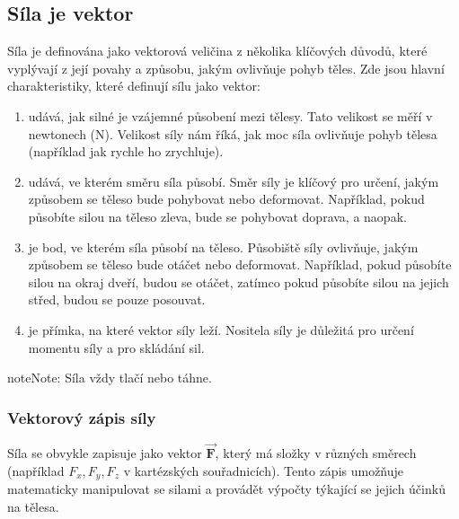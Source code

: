 \documentclass[letterpaper,10pt,english]{jupyterBook}
\begin{document}
\subsection{Síla je vektor}
\label{\detokenize{Prednasky/1_3_Dynamika_pohybu_v_1D:sila-je-vektor}}
\sphinxAtStartPar
Síla je definována jako vektorová veličina z několika klíčových důvodů, které vyplývají z její povahy a způsobu, jakým ovlivňuje pohyb těles. Zde jsou hlavní charakteristiky, které definují sílu jako vektor:
\begin{enumerate}
%
\item {} 
\sphinxAtStartPar
{} udává, jak silné je vzájemné působení mezi tělesy. Tato velikost se měří v newtonech (N). Velikost síly nám říká, jak moc síla ovlivňuje pohyb tělesa (například jak rychle ho zrychluje).

\item {} 
\sphinxAtStartPar
{} udává, ve kterém směru síla působí. Směr síly je klíčový pro určení, jakým způsobem se těleso bude pohybovat nebo deformovat. Například, pokud působíte silou na těleso zleva, bude se pohybovat doprava, a naopak.

\item {} 
\sphinxAtStartPar
{} je bod, ve kterém síla působí na těleso. Působiště síly ovlivňuje, jakým způsobem se těleso bude otáčet nebo deformovat. Například, pokud působíte silou na okraj dveří, budou se otáčet, zatímco pokud působíte silou na jejich střed, budou se pouze posouvat.

\item {} 
\sphinxAtStartPar
{} je přímka, na které vektor síly leží. Nositela síly je důležitá pro určení momentu síly a pro skládání sil.

\end{enumerate}

\sphinxAtStartPar
{}

\sphinxAtStartPar
{}

\begin{sphinxadmonition}{note}{Note:}
\sphinxAtStartPar
Síla vždy tlačí nebo táhne.
\end{sphinxadmonition}


\subsubsection{Vektorový zápis síly}
\label{\detokenize{Prednasky/1_3_Dynamika_pohybu_v_1D:vektorovy-zapis-sily}}
\sphinxAtStartPar
Síla se obvykle zapisuje jako vektor \(\vec{\mathbf{F}}\), který má složky v různých směrech (například \(F_x, F_y, F_z\) v kartézských souřadnicích). Tento zápis umožňuje matematicky manipulovat se silami a provádět výpočty týkající se jejich účinků na tělesa.
\end{document}
